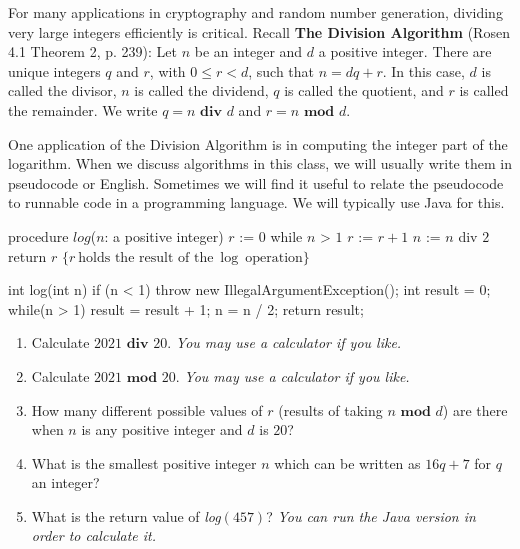 
For many applications in cryptography and random number generation,
dividing very large integers efficiently is critical.  Recall {\bf The Division Algorithm} (Rosen 4.1 Theorem 2, p. 239):
 Let $n$ be an integer 
and $d$ a positive integer. There are unique integers $q$ and $r$, with $0 \leq r < d$, such that 
$n = dq + r$. In this case, $d$ is called the divisor, $n$ is called the dividend, $q$ is called the quotient, 
and $r$ is called the remainder. We write $q=n \textbf{ div } d$ and $r=n \textbf{ mod } d$.

One application of the Division Algorithm is in computing the integer part of the logarithm.
When we discuss algorithms in this class, we will usually write them in 
pseudocode or English. Sometimes we will find it useful to relate the pseudocode to
runnable code in a programming language. We will typically use Java for this.

\begin{multicols}{2}
\begin{algorithm}[caption={Calculating log in pseudocode}]
procedure $\textit{log}$($n$: a positive integer)
$r$ := $0$
while $n$ > $1$
  $r$ := $r + 1$
  $n$ := $n$ div $2$
return $r$ $\{ r~\textrm{holds the result of the}~\log~\textrm{operation}\} $
\end{algorithm}
\columnbreak
\begin{java}[caption={Calculating log in Java}]
int log(int n) {
  if (n < 1) { 
    throw new IllegalArgumentException(); 
  }
  int result = 0;
  while(n > 1) {
    result = result + 1;
    n = n / 2;
  }
  return result;
}
\end{java}
\end{multicols}


\begin{enumerate}
\item Calculate $2021 \textbf{ div } 20$.  {\it You may use a calculator if you like.}
\item Calculate $2021 \textbf{ mod } 20$.  {\it You may use a calculator if you like.}
\item How many different possible values of $r$ (results of taking $n \textbf{ mod } d$) are there when 
$n$ is any positive integer and $d$ is $20$?
\item What is the smallest positive integer $n$ which can be written as $16q+7$ for $q$ an integer?
\item What is the return value of \textit{log$(457)$}?
{\it You can run the Java version in order to calculate it.}
\end{enumerate}

